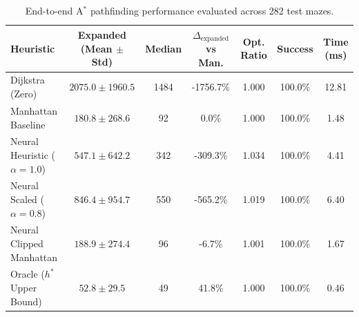 \begin{table}[H]
\centering
\small
\begin{tabular}{lcccccc}
\toprule
\textbf{Heuristic} & \textbf{Expanded (Mean $\pm$ Std)} & \textbf{Median} & \textbf{$\Delta_{\text{expanded}}$ vs Man.} & \textbf{Opt. Ratio} & \textbf{Success} & \textbf{Time (ms)} \\
\midrule
Dijkstra (Zero) & $2075.0 \pm 1960.5$ & 1484 & -1756.7\% & 1.000 & 100.0\% & 12.81 \\
Manhattan Baseline & $180.8 \pm 268.6$ & 92 & 0.0\% & 1.000 & 100.0\% & 1.48 \\
Neural Heuristic ($\alpha=1.0$) & $547.1 \pm 642.2$ & 342 & -309.3\% & 1.034 & 100.0\% & 4.41 \\
Neural Scaled ($\alpha=0.8$) & $846.4 \pm 954.7$ & 550 & -565.2\% & 1.019 & 100.0\% & 6.40 \\
Neural Clipped Manhattan & $188.9 \pm 274.4$ & 96 & -6.7\% & 1.001 & 100.0\% & 1.67 \\
Oracle ($h^\ast$ Upper Bound) & $52.8 \pm 29.5$ & 49 & 41.8\% & 1.000 & 100.0\% & 0.46 \\
\bottomrule
\end{tabular}
\caption{End-to-end A$^\ast$ pathfinding performance evaluated across 282 test mazes.}
\label{tab:search_results}
\end{table}
